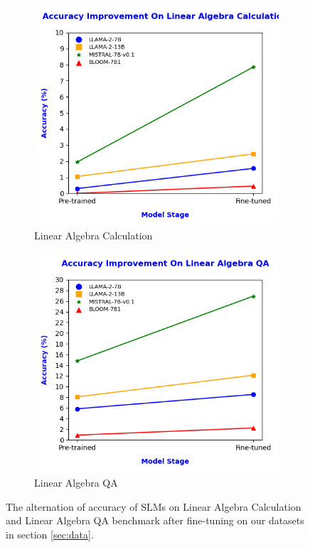 \documentclass[10pt]{article}
\begin{document}
\begin{figure}[h]
    \centering
    \begin{subfigure}[b]{0.45\linewidth}
        \centering
        \includegraphics[width=\linewidth]{Figures/Accuracy_Improvement_Calculation.png}
        \caption{Linear Algebra Calculation}
        \label{fig:Accuracy_Calculation}
    \end{subfigure}
    \hfill
    \begin{subfigure}[b]{0.45\linewidth}
        \centering
        \includegraphics[width=\linewidth]{Figures/Accuracy_Improvement_of_QA.png}
        \caption{Linear Algebra QA}
        \label{fig:Accuracy_QA}
    \end{subfigure}
    \caption{The alternation of accuracy of SLMs on Linear Algebra Calculation and Linear Algebra QA benchmark after fine-tuning on our datasets in section \ref{sec:data}.}
    \label{fig:Accuracy_Improvements}
\end{figure}
\end{document}
